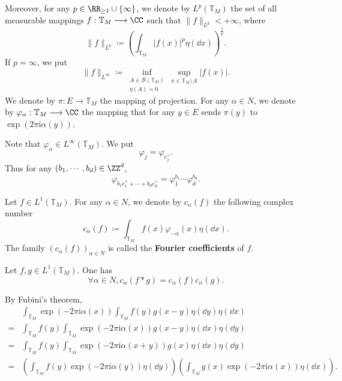 Moreover, for any $p \in \RR_{\ge 1} \cup \{\infty\}$, we denote by $L^p(\mathbb{T}_{M})$ the set of all measurable mappings $f:\mathbb{T}_{M} \longrightarrow \CC$ such that $\|f\|_{L^p} < +\infty$, where
$$\|f\|_{L^p} \coloneq \left(\int_{\mathbb{T}_M} |f(x)|^p \eta(\dd x)\right)^{\frac{1}{p}}.$$
If $p = \infty$, we put
$$\|f\|_{L^\infty} \coloneq \inf_{\substack{A \in \mathcal{B}(\mathbb{T}_M)\\ \eta(A) = 0}} \sup_{x \in \mathbb{T}_{M}\setminus A} |f(x)|.$$
We denote by $\pi : E \longrightarrow \mathbb{T}_{M}$ the mapping of projection.
For any $\alpha \in N$, we denote by $\varphi_{\alpha} : \mathbb{T}_M \longrightarrow \CC$ the mapping that for any $y \in E$ sends $\pi(y)$ to $\exp(2\pi \mathrm{i} \alpha(y))$.
\begin{figure}[H]
    \centering
\end{figure}
Note that $\varphi_{\alpha} \in L^\infty(\mathbb{T}_{M})$.
We put
$$\varphi_{j} = \varphi_{e^\vee_j}.$$
Thus for any $(b_1,\cdots,b_d) \in \ZZ^d$,
$$\varphi_{b_1e^\vee_1 + \cdots + b_de^\vee_d} = \varphi_{1}^{b_1} \cdots \varphi_{d}^{b_d}.$$

\begin{definitionenv}
    Let $f \in L^{1}(\mathbb{T}_{M})$.
    For any $\alpha \in N$, we denote by $c_{\alpha}(f)$ the following complex number
    $$c_{\alpha} (f) \coloneq \int_{\mathbb{T}_{M}} f(x) \varphi_{-\alpha}(x) \eta(\dd x).$$
    The family $(c_{\alpha}(f))_{\alpha \in N}$ is called the \textbf{Fourier coefficients} of $f$.
\end{definitionenv}

\begin{propositionenv}
    Let $f,g \in L^1(\mathbb{T}_{M})$.
    One has
    $$\forall \alpha \in N, c_{\alpha} (f * g) = c_{\alpha} (f) c_{\alpha} (g).$$
\end{propositionenv}
\begin{proofenv}
    By Fubini's theorem,
    $$\begin{aligned}
        & \int_{\mathbb{T}_{M}}\exp(-2\pi \mathrm{i} \alpha(x)) \int_{\mathbb{T}_{M}} f(y) g(x - y) \eta(\dd y) \eta(\dd x)\\
        = & \int_{\mathbb{T}_{M}} f(y) \int_{\mathbb{T}_{M}} \exp(-2\pi \mathrm{i} \alpha(x)) g(x - y) \eta(\dd x) \eta(\dd y)\\
        = & \int_{\mathbb{T}_{M}} f(y) \int_{\mathbb{T}_{M}} \exp(-2\pi \mathrm{i} \alpha(x + y)) g(x) \eta(\dd x) \eta(\dd y)\\
        = & \left(\int_{\mathbb{T}_{M}} f(y) \exp(- 2\pi \mathrm{i} \alpha(y)) \eta(\dd y)\right) \left(\int_{\mathbb{T}_{M}} g(x) \exp(-2\pi \mathrm{i} \alpha(x))\eta(\dd x)\right).
    \end{aligned}$$
\end{proofenv}

